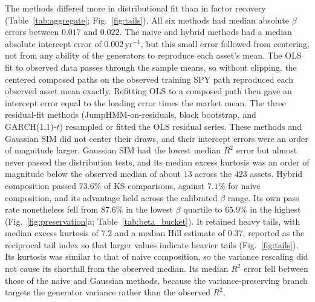 The methods differed more in distributional fit than in factor
recovery (Table~\ref{tab:aggregate}; Fig.~\ref{fig:tails}). All six
methods had median absolute $\beta$ errors between $0.017$ and
$0.022$. The naive and hybrid methods had a median absolute intercept
error of $0.002\,\mathrm{yr}^{-1}$, but this small error followed from
centering, not from any ability of the generators to reproduce each
asset's mean. The OLS fit to observed data passes through the sample
means, so without clipping, the centered composed paths on the
observed training SPY path reproduced each observed asset mean
exactly. Refitting OLS to a composed path then gave an intercept error
equal to the loading error times the market mean. The three
residual-fit methods (JumpHMM-on-residuals, block bootstrap, and
GARCH(1,1)-$t$) resampled or fitted the OLS residual series. These
methods and Gaussian SIM did not center their draws, and their
intercept errors were an order of magnitude larger. Gaussian SIM had
the lowest median $R^2$ error but almost never passed the distribution
tests, and its median excess kurtosis was an order of magnitude below
the observed median of about $13$ across the $423$ assets. Hybrid
composition passed $73.6\%$ of KS comparisons, against $7.1\%$ for
naive composition, and its advantage held across the calibrated
$\beta$ range. Its own pass rate nonetheless fell from $87.6\%$ in the
lowest $\beta$ quartile to $65.9\%$ in the highest
(Fig.~\ref{fig:preservation}a; Table~\ref{tab:beta_bucket}). It retained heavy tails,
with median excess kurtosis of $7.2$ and a median Hill estimate of
$0.37$, reported as the reciprocal tail index so that larger values
indicate heavier tails (Fig.~\ref{fig:tails}). Its kurtosis was
similar to that of naive composition, so the variance rescaling did
not cause its shortfall from the observed median. Its median $R^2$ error fell between those of the naive and
Gaussian methods, because the variance-preserving branch targets the
generator variance rather than the observed $R^2$.

